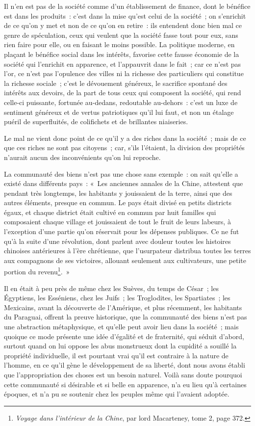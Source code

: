 \documentclass[french,twoside]{book} %
\begin{document}
Il n’en est pas de la société comme d’un établissement de finance, dont le bénéfice est dans les produits : c’est dans la mise qu’est celui de la société ; on s’enrichit de ce qu’on y met et non de ce qu’on en retire : ils entendent donc bien mal ce genre de spéculation, ceux qui veulent que la société fasse tout pour eux, sans rien faire pour elle, ou en faisant le moins possible. La politique moderne, en plaçant le bénéfice social dans les intérêts, favorise cette fausse économie de la société qui l’enrichit en apparence, et l’appauvrit dans le fait ; car ce n’est pas l’or, ce n’est pas l’opulence des villes ni la richesse des particuliers qui constitue la richesse sociale ; c’est le dévouement généreux, le sacrifice spontané des intérêts aux devoirs, de la part de tous ceux qui composent la société, qui rend celle-ci puissante, fortunée au-dedans, redoutable au-dehors : c’est un luxe de sentiment généreux et de vertus patriotiques qu’il lui faut, et non un étalage puéril de superfluités, de colifichets et de brillantes niaiseries.\par
Le mal ne vient donc point de ce qu’il y a des riches dans la société ; mais de ce que ces riches ne sont pas citoyens ; car, s’ils l’étaient, la division des propriétés n’aurait aucun des inconvénients qu’on lui reproche.\par
La communauté des biens n’est pas une chose sans exemple : on sait qu’elle a existé dans différents pays : « Les anciennes annales de la Chine, attestent que pendant très longtemps, les habitants y jouissaient de la terre, ainsi que des autres éléments, presque en commun. Le pays était divisé en petits districts égaux, et chaque district était cultivé en commun par huit familles qui composaient chaque village et jouissaient de tout le fruit de leurs labeurs, à l’exception d’une partie qu’on réservait pour les dépenses publiques. Ce ne fut qu’à la suite d’une révolution, dont parlent avec douleur toutes les histoires chinoises antérieures à l’ère chrétienne, que l’usurpateur distribua toutes les terres aux compagnons de ses victoires, allouant seulement aux cultivateurs, une petite portion du revenu\footnote{{\itshape Voyage dans l’intérieur de la Chine}, par lord Macarteney, tome 2, page 372.}. »\par
Il en était à peu près de même chez les Suèves, du temps de César ; les Égyptiens, les Esséniens, chez les Juifs ; les Troglodites, 
\label{\_GoBack}les Spartiates ; les Mexicains, avant la découverte de l’Amérique, et plus récemment, les habitants du Paraguai, offrent la preuve historique, que la communauté des biens n’est pas une abstraction métaphysique, et qu’elle peut avoir lieu dans la société ; mais quoique ce mode présente une idée d’égalité et de fraternité, qui séduit d’abord, surtout quand on lui oppose les abus monstrueux dont la cupidité a souillé la propriété individuelle, il est pourtant vrai qu’il est contraire à la nature de l’homme, en ce qu’il gène le développement de sa liberté, dont nous avons établi que l’appropriation des choses est un besoin naturel. Voilà sans doute pourquoi cette communauté si désirable et si belle en apparence, n’a eu lieu qu’à certaines époques, et n’a pu se soutenir chez les peuples même qui l’avaient adoptée.\par
\end{document}
